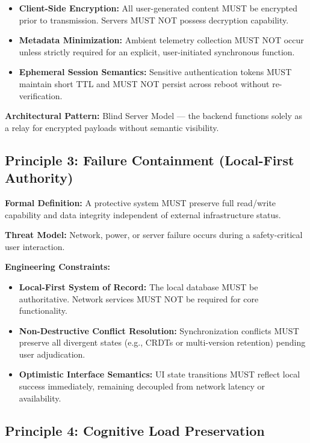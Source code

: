 \documentclass[acmsmall,review]{acmart}
\begin{document}
\begin{itemize}
    \item \textbf{Client-Side Encryption:} All user-generated content MUST be encrypted prior to transmission. Servers MUST NOT possess decryption capability.
    \item \textbf{Metadata Minimization:} Ambient telemetry collection MUST NOT occur unless strictly required for an explicit, user-initiated synchronous function.
    \item \textbf{Ephemeral Session Semantics:} Sensitive authentication tokens MUST maintain short TTL and MUST NOT persist across reboot without re-verification.
\end{itemize}

\textbf{Architectural Pattern:} Blind Server Model --- the backend functions solely as a relay for encrypted payloads without semantic visibility.

\subsection{Principle 3: Failure Containment (Local-First Authority)}

\textbf{Formal Definition:} A protective system MUST preserve full read/write capability and data integrity independent of external infrastructure status.

\textbf{Threat Model:} Network, power, or server failure occurs during a safety-critical user interaction.

\textbf{Engineering Constraints:}

\begin{itemize}
    \item \textbf{Local-First System of Record:} The local database MUST be authoritative. Network services MUST NOT be required for core functionality.
    \item \textbf{Non-Destructive Conflict Resolution:} Synchronization conflicts MUST preserve all divergent states (e.g., CRDTs or multi-version retention) pending user adjudication.
    \item \textbf{Optimistic Interface Semantics:} UI state transitions MUST reflect local success immediately, remaining decoupled from network latency or availability.
\end{itemize}

\subsection{Principle 4: Cognitive Load Preservation}
\end{document}

